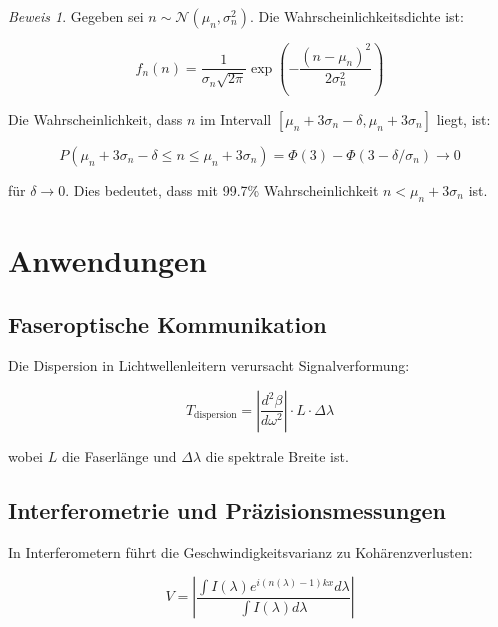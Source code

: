 \documentclass[a4paper,12pt]{article}
\theoremstyle{definition}
\theoremstyle{remark}
\newtheorem*{beweis}{Beweis}
\newcommand{\refIndex}{n}
\begin{document}
\begin{beweis}
Gegeben sei $\refIndex \sim \mathcal{N}(\mu_n, \sigma_n^2)$. Die Wahrscheinlichkeitsdichte ist:

\begin{equation}
    f_{\refIndex}(n) = \frac{1}{\sigma_n\sqrt{2\pi}} \exp\left(-\frac{(n-\mu_n)^2}{2\sigma_n^2}\right)
\end{equation}

Die Wahrscheinlichkeit, dass $\refIndex$ im Intervall $[\mu_n + 3\sigma_n - \delta, \mu_n + 3\sigma_n]$ liegt, ist:

\begin{equation}
    P(\mu_n + 3\sigma_n - \delta \leq \refIndex \leq \mu_n + 3\sigma_n) = \Phi(3) - \Phi(3 - \delta/\sigma_n) \to 0
\end{equation}

für $\delta \to 0$. Dies bedeutet, dass mit 99.7\% Wahrscheinlichkeit $\refIndex < \mu_n + 3\sigma_n$ ist.
\end{beweis}

\section{Anwendungen}

\subsection{Faseroptische Kommunikation}

Die Dispersion in Lichtwellenleitern verursacht Signalverformung:

\begin{equation}
    T_{\text{dispersion}} = \left|\frac{d^2 \beta}{d\omega^2}\right| \cdot L \cdot \Delta \lambda
\end{equation}

wobei $L$ die Faserlänge und $\Delta \lambda$ die spektrale Breite ist.

\subsection{Interferometrie und Präzisionsmessungen}

In Interferometern führt die Geschwindigkeitsvarianz zu Kohärenzverlusten:

\begin{equation}
    V = \left|\frac{\int I(\lambda) e^{i(n(\lambda)-1)kx} d\lambda}{\int I(\lambda) d\lambda}\right|
\end{equation}
\end{document}
